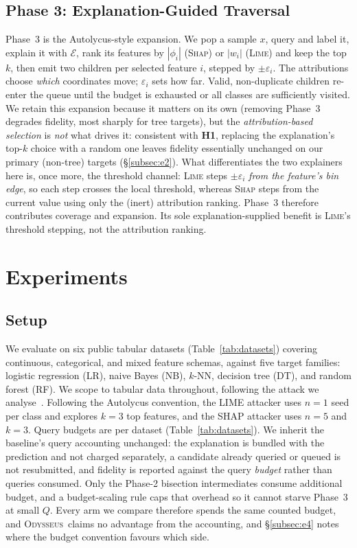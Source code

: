 \documentclass[sigconf,anonymous,review]{acmart}
\newcommand{\sys}{\textsc{Odysseus}}
\begin{document}
\subsection{Phase 3: Explanation-Guided Traversal}
\label{subsec:traversal}
Phase~3 is the Autolycus-style expansion. We pop a sample $x$, query and label it,
explain it with $\mathcal{E}$, rank its features by $|\phi_i|$ (\textsc{Shap}) or $|w_i|$
(\textsc{Lime}) and keep the top $k$, then emit two children per selected feature $i$, stepped by
$\pm\varepsilon_i$. The attributions choose \emph{which} coordinates move; $\varepsilon_i$ sets how far. Valid, non-duplicate children re-enter the queue until the budget is
exhausted or all classes are sufficiently visited. We retain this expansion because it matters on its own (removing Phase~3 degrades fidelity, most sharply for tree targets), but the \emph{attribution-based selection} is \emph{not} what drives it:
consistent with \textbf{H1}, replacing the explanation's top-$k$ choice with a random one
leaves fidelity essentially unchanged on our primary (non-tree) targets
(\S\ref{subsec:e2}). What differentiates the two explainers here is, once more, the
threshold channel: \textsc{Lime} steps $\pm\varepsilon_i$ \emph{from the feature's bin edge}, so each step crosses the local threshold, whereas \textsc{Shap} steps from the
current value using only the (inert) attribution ranking. Phase~3 therefore contributes
coverage and expansion. Its sole explanation-supplied benefit is \textsc{Lime}'s
threshold stepping, not the attribution ranking.

\section{Experiments}
\label{sec:experiments}
\subsection{Setup}
\label{subsec:setup}
We evaluate on six public tabular datasets (Table~\ref{tab:datasets}) covering continuous,
categorical, and mixed feature schemas, against five target families: logistic regression (LR), naive
Bayes (NB), $k$-NN, decision tree (DT), and random forest (RF). We scope to tabular data throughout,
following the attack we analyse~\cite{oksuz2024autolycus}. Following the Autolycus convention, the
LIME attacker uses $n{=}1$
seed per class and explores $k{=}3$ top features, and the SHAP attacker uses $n{=}5$ and $k{=}3$.
Query budgets are per dataset (Table~\ref{tab:datasets}). We inherit the baseline's query
accounting unchanged: the explanation is bundled with the prediction and not charged separately, a
candidate already queried or queued is not resubmitted, and fidelity is reported against the query
\emph{budget} rather than queries consumed. Only the Phase-2 bisection intermediates consume
additional budget, and a budget-scaling rule caps that overhead so it cannot starve Phase~3 at small
$Q$. Every arm we compare therefore spends the same counted budget, and \sys\ claims no advantage from the accounting, and \S\ref{subsec:e4} notes where the budget convention favours which side.
\end{document}
